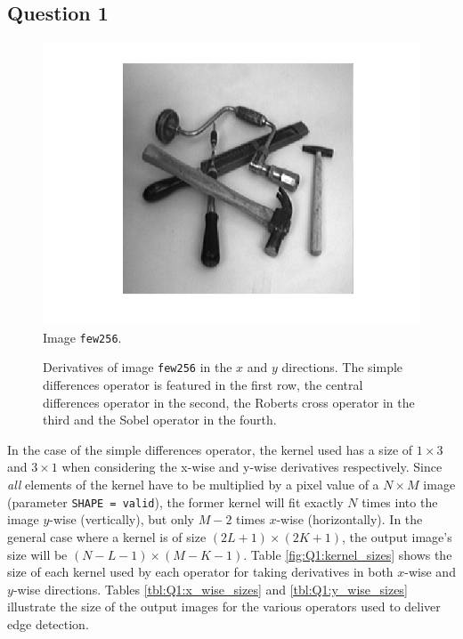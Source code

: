 \subsection{Question 1}

\begin{figure}[H]
	\centering
	\includegraphics[scale=0.8]{./images/Q1/tools.png}
	\caption{Image \texttt{few256}.}
	\label{fig:Q1:tools}
\end{figure}


\begin{figure}[H]
	\centering
	\scalebox{0.9}{}
	\caption{Derivatives of image \texttt{few256} in the $x$ and $y$ directions.
    The simple differences operator is featured in the first row,
	the central differences operator in the second, the Roberts cross operator
in the third and the Sobel operator in the fourth.}
	\label{fig:Q1:derivatives}
\end{figure}


In the case of the simple differences operator, the kernel used has a size of
$1 \times 3$ and $3 \times 1$ when considering the x-wise and y-wise
derivatives respectively. Since \textit{all} elements of the kernel have to
be multiplied by a pixel value of a $N \times M$ image (parameter \texttt{SHAPE = valid}),
the former kernel will fit exactly $N$ times into the image $y$-wise (vertically),
but only $M-2$ times $x$-wise (horizontally). In the general case where
a kernel is of size $(2L+1) \times (2K+1)$, the output image's size will be
$(N-L-1) \times (M-K-1)$. Table \ref{fig:Q1:kernel_sizes} shows the size of each
kernel used by each operator for taking derivatives in both $x$-wise and $y$-wise
directions. Tables \ref{tbl:Q1:x_wise_sizes} and
\ref{tbl:Q1:y_wise_sizes} illustrate the size of the output images for the
various operators used to deliver edge detection.


